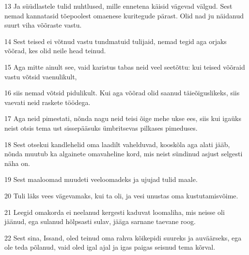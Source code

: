 \par 13 Ja süüdlastele tulid nuhtlused, mille ennetena käisid vägevad välgud. Sest nemad kannatasid tõepoolest omaenese kuritegude pärast. Olid nad ju näidanud suurt viha võõraste vastu.
\par 14 Sest teised ei võtnud vastu tundmatuid tulijaid, nemad tegid aga orjaks võõrad, kes olid neile head teinud.
\par 15 Aga mitte ainult see, vaid karistus tabas neid veel seetõttu: kui teised võõraid vastu võtsid vaenulikult,
\par 16 siis nemad võtsid pidulikult. Kui aga võõrad olid saanud täieõiguslikeks, siis vaevati neid raskete töödega.
\par 17 Aga neid pimestati, nõnda nagu neid teisi õige mehe ukse ees, siis kui igaüks neist otsis tema ust sissepääsuks ümbritsevas pilkases pimeduses.
\par 18 Sest otsekui kandlehelid oma laadilt vahelduvad, kooskõla aga alati jääb, nõnda muutub ka algainete omavaheline kord, mis neist sündinud asjust selgesti näha on.
\par 19 Sest maaloomad muudeti veeloomadeks ja ujujad tulid maale.
\par 20 Tuli läks vees vägevamaks, kui ta oli, ja vesi unustas oma kustutamisvõime.
\par 21 Leegid omakorda ei neelanud kergesti kaduvat loomaliha, mis neisse oli jäänud, ega sulanud hõlpsasti sulav, jääga sarnane taevane roog.
\par 22 Sest sina, Issand, oled teinud oma rahva kõikepidi suureks ja auväärseks, ega ole teda põlanud, vaid oled igal ajal ja igas paigas seisnud tema kõrval. 



